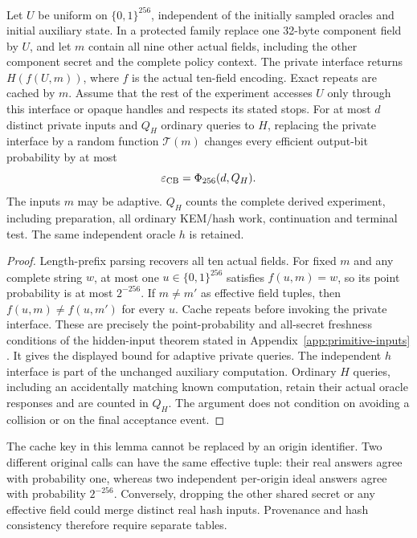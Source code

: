 \begin{lemma}
\label{lem:cb-hidden-component}
Let $U$ be uniform on $\{0,1\}^{256}$, independent of the initially sampled
oracles and initial auxiliary state. In a protected family replace one
32-byte component field by $U$, and let $m$ contain all nine other actual
fields, including the other component secret and the complete policy
context. The private interface returns
$H(f(U,m))$, where $f$ is the actual ten-field encoding. Exact repeats are
cached by $m$. Assume that the rest of the experiment accesses $U$ only
through this interface or opaque handles and respects its stated stops.
For at most $d$ distinct private inputs and $Q_H$ ordinary queries to $H$,
replacing the private interface by a random function $\mathcal T(m)$
changes every efficient output-bit probability by at most
\begin{equation}
 \varepsilon_{\rm CB}=\Phi_{256}(d,Q_H).
 \label{eq:cb-hidden-cost}
\end{equation}
The inputs $m$ may be adaptive. $Q_H$ counts the complete derived
experiment, including preparation, all ordinary KEM/hash work, continuation
and terminal test. The same independent oracle $h$ is retained.
\end{lemma}
\begin{proof}
Length-prefix parsing recovers all ten actual fields. For fixed $m$ and any
complete string $w$, at most one $u\in\{0,1\}^{256}$ satisfies
$f(u,m)=w$, so its point probability is at most $2^{-256}$. If $m\ne m'$
as effective field tuples, then $f(u,m)\ne f(u,m')$ for every $u$.
Cache repeats before invoking the private interface. These are precisely
the point-probability and all-secret freshness conditions of the
hidden-input theorem stated in Appendix~\ref{app:primitive-inputs}
\cite[Theorem~2]{dfh2022}. It gives the displayed bound for adaptive
private queries. The independent $h$ interface is part of the unchanged
auxiliary computation. Ordinary $H$ queries, including an accidentally
matching known computation, retain their actual oracle responses and are
counted in $Q_H$. The argument does not condition on avoiding a collision
or on the final acceptance event.
\end{proof}

The cache key in this lemma cannot be replaced by an origin identifier.
Two different original calls can have the same effective tuple: their real
answers agree with probability one, whereas two independent per-origin
ideal answers agree with probability $2^{-256}$. Conversely, dropping the
other shared secret or any effective field could merge distinct real hash
inputs. Provenance and hash consistency therefore require separate tables.

